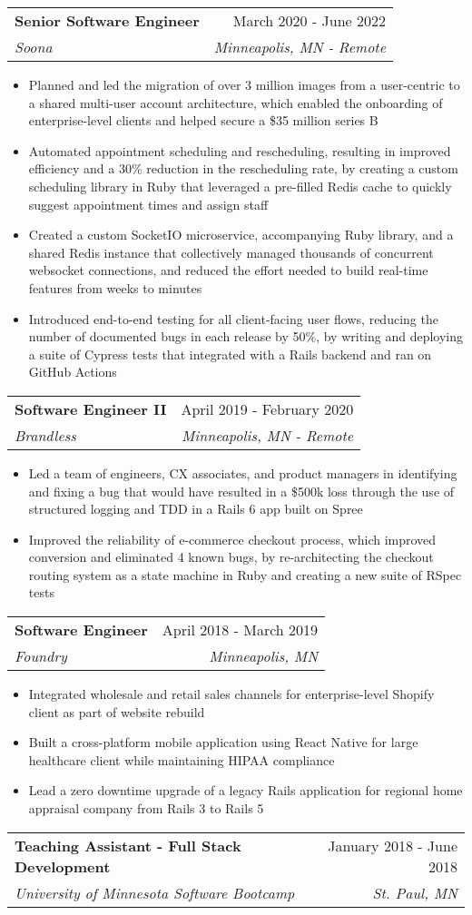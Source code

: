 \documentclass[letterpaper,11pt]{article}
\makeatletter
\newcommand{\resumeItem}[1]{
  \item\small{
    {#1 \vspace{-2pt}}
  }
}
\newcommand{\resumeSubheading}[4]{
  \vspace{-2pt}\item
    \begin{tabular*}{0.97\textwidth}[t]{l@{\extracolsep{\fill}}r}
      \textbf{#1} & #2 \\
      \textit{\small#3} & \textit{\small #4} \\
    \end{tabular*}\vspace{-7pt}
}
\newcommand{\resumeItemListStart}{\begin{itemize}}
\newcommand{\resumeItemListEnd}{\end{itemize}\vspace{-5pt}}
\makeatother
\begin{document}
    \resumeSubheading
      {Senior Software Engineer}{March 2020 - June 2022}
      {Soona}{Minneapolis, MN - Remote}
      \resumeItemListStart
        \resumeItem{Planned and led the migration of over 3 million images from a user-centric to a shared multi-user account architecture, which enabled the onboarding of enterprise-level clients and helped secure a \$35 million series B}
        \resumeItem{Automated appointment scheduling and rescheduling, resulting in improved efficiency and a 30\% reduction in the rescheduling rate, by creating a custom scheduling library in Ruby that leveraged a pre-filled Redis cache to quickly suggest appointment times and assign staff}
        \resumeItem{Created a custom SocketIO microservice, accompanying Ruby library, and a shared Redis instance that collectively managed thousands of concurrent websocket connections, and reduced the effort needed to build real-time features from weeks to minutes}
        \resumeItem{Introduced end-to-end testing for all client-facing user flows, reducing the number of documented bugs in each release by 50\%, by writing and deploying a suite of Cypress tests that integrated with a Rails backend and ran on GitHub Actions}
      \resumeItemListEnd

    \resumeSubheading
      {Software Engineer II}{April 2019 - February 2020}
      {Brandless}{Minneapolis, MN - Remote}
      \resumeItemListStart
        \resumeItem{Led a team of engineers, CX associates, and product managers in identifying and fixing a bug that would have resulted in a \$500k loss through the use of structured logging and TDD in a Rails 6 app built on Spree}
        \resumeItem{Improved the reliability of e-commerce checkout process, which improved conversion and eliminated 4 known bugs, by re-architecting the checkout routing system as a state machine in Ruby and creating a new suite of RSpec tests}
      \resumeItemListEnd

    \resumeSubheading
      {Software Engineer}{April 2018 - March 2019}
      {Foundry}{Minneapolis, MN}
      \resumeItemListStart
				\resumeItem{Integrated wholesale and retail sales channels for enterprise-level Shopify client as part of website rebuild}
				\resumeItem{Built a cross-platform mobile application using React Native for large healthcare client while maintaining HIPAA compliance}
				\resumeItem{Lead a zero downtime upgrade of a legacy Rails application for regional home appraisal company from Rails 3 to Rails 5}
      \resumeItemListEnd

    \resumeSubheading
      {Teaching Assistant - Full Stack Development}{January 2018 - June 2018}
      {University of Minnesota Software Bootcamp}{St. Paul, MN}
\end{document}
